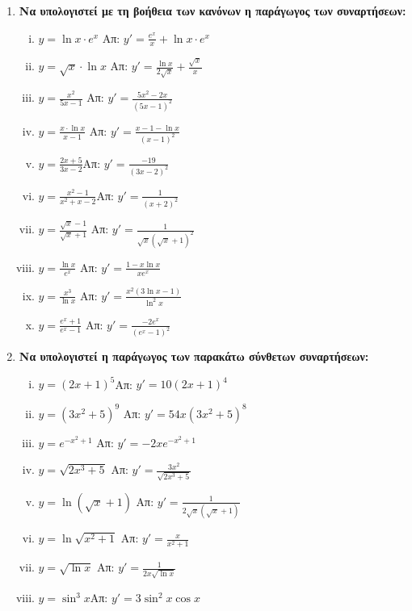 \begin{enumerate}
  \item {\bfseries Να υπολογιστεί με τη βοήθεια των κανόνων η παράγωγος των συναρτήσεων:}
    \begin{enumerate}[i)]
      \item $ y= \ln{x} \cdot e^{x} $ 
        \hfill Απ: $ y'= \frac{e^{x}}{x} + \ln{x}\cdot e^{x} $ 
      \item $ y= \sqrt{x}\cdot \ln{x} $ 
        \hfill Απ: $ y'= \frac{\ln{x}}{2 \sqrt{ x }}  + \frac{\sqrt{ x }}{x} $ 
      \item $ y= \frac{x^{2}}{5x-1} $ \hfill Απ: $ y'= \frac{5x^{2}-2x}{(5x-1)^{2}} $  
      \item $ y = \frac{x\cdot \ln{x}}{x-1} $ 
        \hfill Απ: $ y' = \frac{x-1- \ln{x}}{(x-1)^{2}} $ 
      \item $y=\frac{2x+5}{3x-2}$\hfill Απ: $y'=\frac{-19}{(3x-2)^2}$
      \item $y=\frac{x^2-1}{x^2+x-2}$\hfill Απ: $y'=\frac{1}{(x+2)^2}$
      \item $y=\frac{\sqrt{x}-1}{\sqrt{x}+1}$
        \hfill Απ: $y'=\frac{1}{\sqrt{x}(\sqrt{x}+1)^2}$
      \item $ y= \frac{\ln{x}}{e^{x}} $ \hfill Απ: $ y'= \frac{1 - x \ln{x}}{xe^{x}} $ 
      \item $ y= \frac{x^{3}}{\ln{x}} $ 
        \hfill Απ: $ y' = \frac{x^{2}(3 \ln{x} -1)}{\ln^{2}{x} } $ 
      \item $ y= \frac{e^{x}+1}{e^{x}-1} $ 
        \hfill Απ: $ y'= \frac{-2e^{x}}{(e^{x}-1)^{2}} $ 
    \end{enumerate}

  \item {\bfseries Να υπολογιστεί η παράγωγος των παρακάτω σύνθετων συναρτήσεων:}
    \begin{enumerate}[i)]
      \item $y=(2x+1)^5$\hfill Απ: $y'=10(2x+1)^4$
      \item $ y=(3x^{2}+5)^{9} $ \hfill Απ: $ y'=54x(3x^{2}+5)^{8} $ 
      \item $ y=e^{-x^{2}+1} $ \hfill Απ: $ y'=-2x e^{-x^{2}+1} $ 
      \item $ y= \sqrt{2x^{3}+5} $ \hfill Απ: $ y'= \frac{3x^{2}}{\sqrt{2x^{3}+5}} $ 
      \item $ y= \ln{(\sqrt{ x } +1)} $ 
        \hfill Απ: $ y'= \frac{1}{2 \sqrt{ x } (\sqrt{ x } +1)} $ 
      \item $y= \ln{\sqrt{x^{2}+1}} $ \hfill Απ: $ y'= \frac{x}{x^{2}+1} $ 
      \item $ y= \sqrt{ \ln{x} } $ \hfill Απ: $ y'=\frac{1}{2x \sqrt{ \ln{x} }} $ 
      \item $y=\sin^3 x$\hfill Απ: $y'=3\sin^2x \cos x$
    \end{enumerate}
\end{enumerate}








